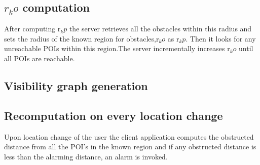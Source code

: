 \subsection{$r_ko$ computation}
\vspace*{5pt}
After computing r$_kp$ the server retrieves all the obstacles within this radius and sets the radius of the known region for obstacles,r$_ko$ as r$_kp$. Then it looks for any unreachable POIs within this region.The server incrementally increases r$_ko$ until all POIs are reachable.\\


\subsection{Visibility graph generation}
\vspace*{5pt}

\subsection{Recomputation on every location change}
\vspace*{5pt}
Upon location change of the user the client application computes the obstructed distance from all the POI's in the known region and if any obstructed distance is less than the alarming distance, an alarm is invoked.





